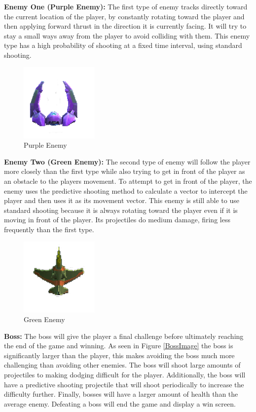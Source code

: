 \documentclass[12pt]{article}       %
\begin{document}
	{\bf Enemy One (Purple Enemy):} The first type of enemy tracks directly toward the current location of the player, by constantly rotating toward the player and then applying forward thrust in the direction it is currently facing. It will try to stay a small ways away from the player to avoid colliding with them. This enemy type has a high probability of shooting at a fixed time interval, using standard shooting. \\

\begin{figure} [H]\centering  \includegraphics[width=1.5in]{PurpleEnemy.png} \caption{Purple Enemy} \label{EnemyOne} \end{figure}

	{\bf Enemy Two (Green Enemy):} The second type of enemy will follow the player more closely than the first type while also trying to get in front of the player as an obstacle to the players movement. To attempt to get in front of the player, the enemy uses the predictive shooting method to calculate a vector to intercept the player and then uses it as its movement vector. This enemy is still able to use standard shooting because it is always rotating toward the player even if it is moving in front of the player. Its projectiles do medium damage, firing less frequently than the first type. \\

\begin{figure} [H]\centering  \includegraphics[width=1.5in]{GreenEnemy.png} \caption{Green Enemy} \label{EnemyTwo} \end{figure} 

	{\bf Boss:} The boss will give the player a final challenge before ultimately reaching the end of the game and winning. As seen in Figure \ref{BossImage} the boss is significantly larger than the player, this makes avoiding the boss much more challenging than avoiding other enemies. The boss will shoot large amounts of projectiles to making dodging difficult for the player. Additionally, the boss will have a predictive shooting projectile that will shoot periodically to increase the difficulty further. Finally, bosses will have a larger amount of health than the average enemy. Defeating a boss will end the game and display a win screen. \\
\end{document}
